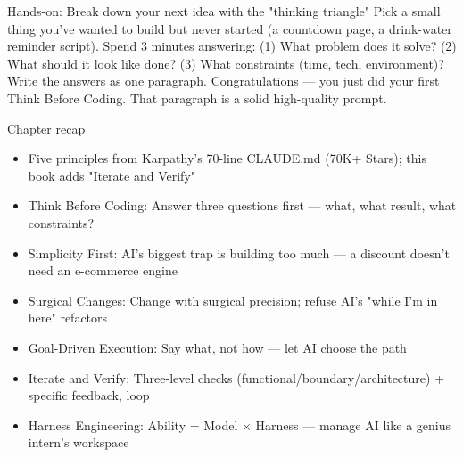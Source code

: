 \begin{tcbpractice}{Hands-on: Break down your next idea with the "thinking triangle"}
Pick a small thing you've wanted to build but never started (a countdown page, a drink-water reminder script). Spend 3 minutes answering: (1) What problem does it solve? (2) What should it look like done? (3) What constraints (time, tech, environment)? Write the answers as one paragraph. Congratulations — you just did your first Think Before Coding. That paragraph is a solid high-quality prompt.

\end{tcbpractice}

\begin{tcbsummary}{Chapter recap}
\begin{itemize}
  \item Five principles from Karpathy's 70-line CLAUDE.md (70K+ Stars); this book adds "Iterate and Verify"
  \item Think Before Coding: Answer three questions first — what, what result, what constraints?
  \item Simplicity First: AI's biggest trap is building too much — a discount doesn't need an e-commerce engine
  \item Surgical Changes: Change with surgical precision; refuse AI's "while I'm in here" refactors
  \item Goal-Driven Execution: Say what, not how — let AI choose the path
  \item Iterate and Verify: Three-level checks (functional/boundary/architecture) + specific feedback, loop
  \item Harness Engineering: Ability = Model × Harness — manage AI like a genius intern's workspace
\end{itemize}

\end{tcbsummary}
